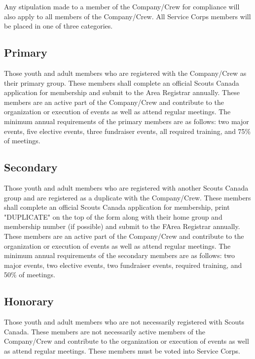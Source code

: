 Any stipulation made to a member of the Company/Crew for compliance will also apply to all members of the Company/Crew.
All Service Corps members will be placed in one of three categories.
\subsection{Primary}
Those youth and adult members who are registered with the Company/Crew as their primary group.
These members shall complete an official Scouts Canada application for membership and submit to the Area Registrar annually.
These members are an active part of the Company/Crew and contribute to the organization or execution of events as well as attend regular meetings.
The minimum annual requirements of the primary members are as follows: two major events, five elective events, three fundraiser events, all required training, and 75\% of meetings.
\subsection{Secondary}
Those youth and adult members who are registered with another Scouts Canada group and are registered as a duplicate with the Company/Crew.
These members shall complete an official Scouts Canada application for membership, print "DUPLICATE" on the top of the form along with their home group and membership number (if possible) and submit to the FArea Registrar annually.
These members are an active part of the Company/Crew and contribute to the organization or execution of events as well as attend regular meetings.
The minimum annual requirements of the secondary members are as follows: two major events, two elective events, two fundraiser events, required training, and 50\% of meetings.
\subsection{Honorary}
Those youth and adult members who are not necessarily registered with Scouts Canada.
These members are not necessarily active members of the Company/Crew and contribute to the organization or execution of events as well as attend regular meetings.
These members must be voted into Service Corps.
